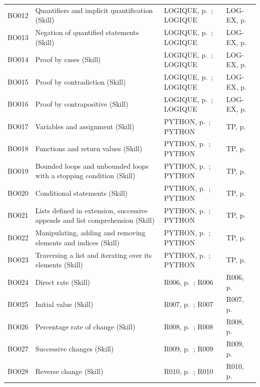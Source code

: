\begin{longtable}{p{.1\linewidth}p{.43\linewidth}p{.19\linewidth}p{.16\linewidth}}
BO012 & Quantifiers and implicit quantification (Skill) & LOGIQUE, p.\,\pageref{LOGIQUE} ; LOGIQUE & LOG-EX, p.\,\pageref{LOG-EX} \\
BO013 & Negation of quantified statements (Skill) & LOGIQUE, p.\,\pageref{LOGIQUE} ; LOGIQUE & LOG-EX, p.\,\pageref{LOG-EX} \\
BO014 & Proof by cases (Skill) & LOGIQUE, p.\,\pageref{LOGIQUE} ; LOGIQUE & LOG-EX, p.\,\pageref{LOG-EX} \\
BO015 & Proof by contradiction (Skill) & LOGIQUE, p.\,\pageref{LOGIQUE} ; LOGIQUE & LOG-EX, p.\,\pageref{LOG-EX} \\
BO016 & Proof by contrapositive (Skill) & LOGIQUE, p.\,\pageref{LOGIQUE} ; LOGIQUE & LOG-EX, p.\,\pageref{LOG-EX} \\
BO017 & Variables and assignment (Skill) & PYTHON, p.\,\pageref{PYTHON} ; PYTHON & TP, p.\,\pageref{TP} \\
BO018 & Functions and return values (Skill) & PYTHON, p.\,\pageref{PYTHON} ; PYTHON & TP, p.\,\pageref{TP} \\
BO019 & Bounded loops and unbounded loops with a stopping condition (Skill) & PYTHON, p.\,\pageref{PYTHON} ; PYTHON & TP, p.\,\pageref{TP} \\
BO020 & Conditional statements (Skill) & PYTHON, p.\,\pageref{PYTHON} ; PYTHON & TP, p.\,\pageref{TP} \\
BO021 & Lists defined in extension, successive appends and list comprehension (Skill) & PYTHON, p.\,\pageref{PYTHON} ; PYTHON & TP, p.\,\pageref{TP} \\
BO022 & Manipulating, adding and removing elements and indices (Skill) & PYTHON, p.\,\pageref{PYTHON} ; PYTHON & TP, p.\,\pageref{TP} \\
BO023 & Traversing a list and iterating over its elements (Skill) & PYTHON, p.\,\pageref{PYTHON} ; PYTHON & TP, p.\,\pageref{TP} \\
BO024 & Direct rate (Skill) & R006, p.\,\pageref{R006} ; R006 & R006, p.\,\pageref{R006} \\
BO025 & Initial value (Skill) & R007, p.\,\pageref{R007} ; R007 & R007, p.\,\pageref{R007} \\
BO026 & Percentage rate of change (Skill) & R008, p.\,\pageref{R008} ; R008 & R008, p.\,\pageref{R008} \\
BO027 & Successive changes (Skill) & R009, p.\,\pageref{R009} ; R009 & R009, p.\,\pageref{R009} \\
BO028 & Reverse change (Skill) & R010, p.\,\pageref{R010} ; R010 & R010, p.\,\pageref{R010} \\

\end{longtable}
